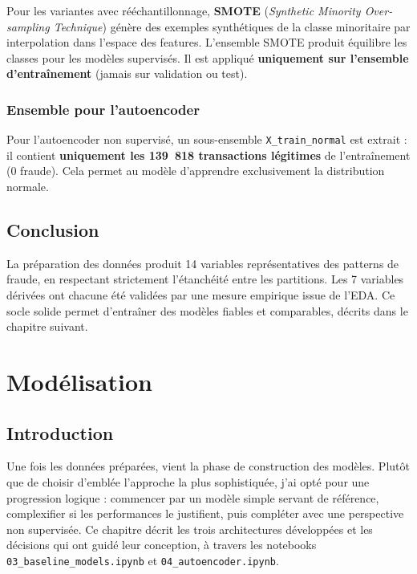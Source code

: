\documentclass[12pt,a4paper,twoside]{report}
\begin{document}
Pour les variantes avec rééchantillonnage, \textbf{SMOTE} (\textit{Synthetic Minority Over-sampling Technique}) génère des exemples synthétiques de la classe minoritaire par interpolation dans l'espace des features. L'ensemble SMOTE produit équilibre les classes pour les modèles supervisés. Il est appliqué \textbf{uniquement sur l'ensemble d'entraînement} (jamais sur validation ou test).

\subsection{Ensemble pour l'autoencoder}

Pour l'autoencoder non supervisé, un sous-ensemble \texttt{X\_train\_normal} est extrait : il contient \textbf{uniquement les 139~818 transactions légitimes} de l'entraînement (0 fraude). Cela permet au modèle d'apprendre exclusivement la distribution normale.

\section{Conclusion}

La préparation des données produit 14 variables représentatives des patterns de fraude, en respectant strictement l'étanchéité entre les partitions. Les 7 variables dérivées ont chacune été validées par une mesure empirique issue de l'EDA. Ce socle solide permet d'entraîner des modèles fiables et comparables, décrits dans le chapitre suivant.

\chapter{Modélisation}

\section{Introduction}

Une fois les données préparées, vient la phase de construction des modèles. Plutôt que de choisir d'emblée l'approche la plus sophistiquée, j'ai opté pour une progression logique : commencer par un modèle simple servant de référence, complexifier si les performances le justifient, puis compléter avec une perspective non supervisée. Ce chapitre décrit les trois architectures développées et les décisions qui ont guidé leur conception, à travers les notebooks \texttt{03\_baseline\_models.ipynb} et \texttt{04\_autoencoder.ipynb}.
\end{document}
